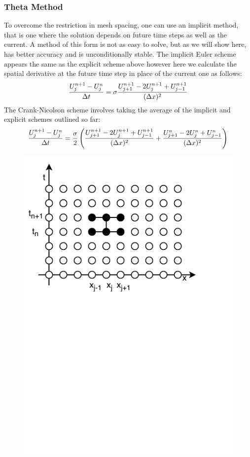     \subsubsection*{Theta Method}
    To overcome the restriction in mesh spacing, one can use an implicit method, that is one where the solution depends on future time steps as well as the current. A method of this form is not as easy to solve, but as we will show here, has better accuracy and is unconditionally stable. The implicit Euler scheme appears the same as the explicit scheme above however here we calculate the spatial derivative at the future time step in place of the current one as follows:
    \[
    \frac{U^{n+1}_{j}  - U^{n}_{j}}{\Delta t} = \sigma \frac{U^{n+1}_{j+1}-2U^{n+1}_{j}+U^{n+1}_{j-1}}{(\Delta x)^2}
    \]
    The Crank-Nicolson scheme involves taking the average of the implicit and explicit schemes outlined so far:
    \[
    \frac{U^{n+1}_{j}-U^{n}_{j}}{\Delta t} = \frac{\sigma}{2}\left(\frac{U^{n+1}_{j+1}-2U^{n+1}_{j}+U^{n+1}_{j-1}}{(\Delta x)^2}+\frac{U^{n}_{j+1}-2U^{n}_{j}+U^{n}_{j-1}}{(\Delta x)^2}\right)
    \]
    \begin{figure}
        \centering
        \includegraphics[width=0.7\linewidth, trim={0 5cm 0 0}, clip]{Figures/CN}
        \caption{}
        \label{fig:CNmesh}
    \end{figure}
    
